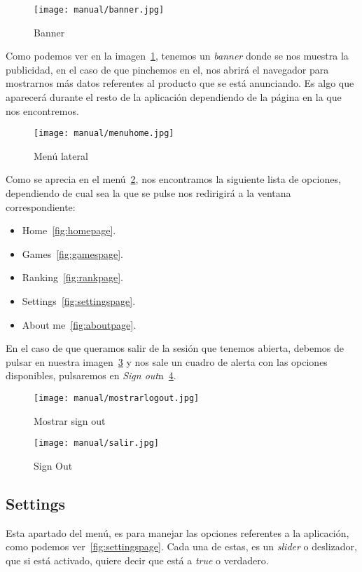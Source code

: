 \begin{figure}[H]
	\centering
	\texttt{[image: manual/banner.jpg]}
	\caption{Banner}\label{fig:banner}
\end{figure}

Como podemos ver en la imagen~\ref{fig:banner}, tenemos un \emph{banner} donde se nos muestra la publicidad, en el caso de que pinchemos en el, nos abrirá el navegador para mostrarnos más datos referentes al producto que se está anunciando. Es algo que aparecerá durante el resto de la aplicación dependiendo de la página en la que nos encontremos.

\begin{figure}[H]
	\centering
	\texttt{[image: manual/menuhome.jpg]}
	\caption{Menú lateral}\label{fig:menuhome}
\end{figure}
 
Como se aprecia en el menú~\ref{fig:menuhome}, nos encontramos la siguiente lista de opciones, dependiendo de cual sea la que se pulse nos redirigirá a la ventana correspondiente:

\begin{itemize}
	\item Home~\ref{fig:homepage}.
	\item Games~\ref{fig:gamespage}.
	\item Ranking~\ref{fig:rankpage}.
	\item Settings~\ref{fig:settingspage}.
	\item About me~\ref{fig:aboutpage}.
\end{itemize}

En el caso de que queramos salir de la sesión que tenemos abierta, debemos de pulsar en nuestra imagen~\ref{fig:mostrarlogout} y nos sale un cuadro de alerta con las opciones disponibles, pulsaremos en \emph{Sign out}n~\ref{fig:salir}.

\begin{figure}[H]
	\centering
	\texttt{[image: manual/mostrarlogout.jpg]}
	\caption{Mostrar sign out}\label{fig:mostrarlogout}
\end{figure}

\begin{figure}[H]
	\centering
	\texttt{[image: manual/salir.jpg]}
	\caption{Sign Out}\label{fig:salir}
\end{figure}

\subsection{Settings}\label{settings}
Esta apartado del menú, es para manejar las opciones referentes a la aplicación, como podemos ver~\ref{fig:settingspage}. Cada una de estas, es un \emph{slider} o deslizador, que si está activado, quiere decir que está a \emph{true} o verdadero.

